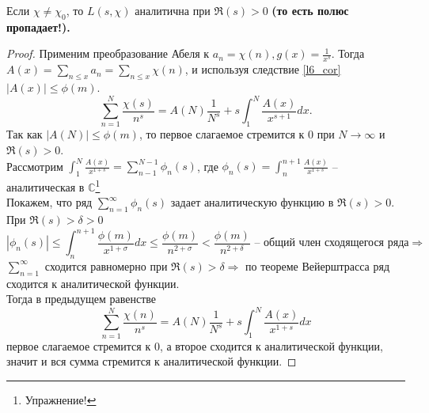 \begin{lemma} \label{l7_lm6}
	Если $\chi \ne \chi_0$, то $L(s, \chi)$ аналитична при $\Re(s) > 0$ \bf (то есть полюс пропадает!).
\end{lemma}
\begin{proof}
	Применим преобразование Абеля к $\displaystyle a_n = \chi(n), g(x) = \frac{1}{x^s}$. Тогда $\displaystyle A(x) = \sum_{n \leq x} a_n = \sum_{n \leq x} \chi(n)$, и используя следствие \ref{l6_cor} $|A(x)| \leq \phi(m)$.
	$$\sum_{n = 1}^{N} \frac{\chi(s)}{n^s} = A(N) \frac{1}{N^s} + s \int_{1}^{N} \frac{A(x)}{x^{s + 1}} dx.$$
	Так как $|A(N)| \leq \phi(m)$, то первое слагаемое стремится к $0$ при $N \rightarrow \infty$ и $\Re(s) > 0$.\\
	Рассмотрим $\displaystyle \int_1^N \frac{A(x)}{x^{1 + s}} = \sum_{n - 1}^{N - 1} \phi_n(s)$, где $\displaystyle \phi_n(s) = \int_{n}^{n + 1} \frac{A(x)}{x^{1 + s}}$ -- аналитическая в $\mathbb{C}$\footnote{Упражнение!}\\
	Покажем, что ряд $\displaystyle \sum_{n = 1}^{\infty} \phi_n(s)$ задает аналитическую функцию в $\Re(s) > 0$. При $\Re(s) > \delta > 0$
	$$|\phi_n(s)| \leq \int_n^{n + 1} \frac{\phi(m)}{x^{1 + \sigma}} dx \leq  \frac{\phi(m)}{n^{2 + \sigma}} < \frac{\phi(m)}{n^{2 + \delta}} \text{ --  общий член сходящегося ряда} \Rightarrow$$
	$\displaystyle \sum_{n = 1}^{\infty}$ сходится равномерно при $\Re(s) > \delta \Rightarrow$ по теореме Вейерштрасса ряд сходится к аналитической функции.\\
	Тогда в предыдущем равенстве 
	$$\sum_{n = 1}^{N} \frac{\chi(n)}{n^s} = A(N) \frac{1}{N^s} + s \int_{1}^{N} \frac{A(x)}{x^{1 + s}} dx$$
	первое слагаемое стремится к 0, а второе сходится к аналитической функции, значит и вся сумма стремится к аналитической функции.
\end{proof}


